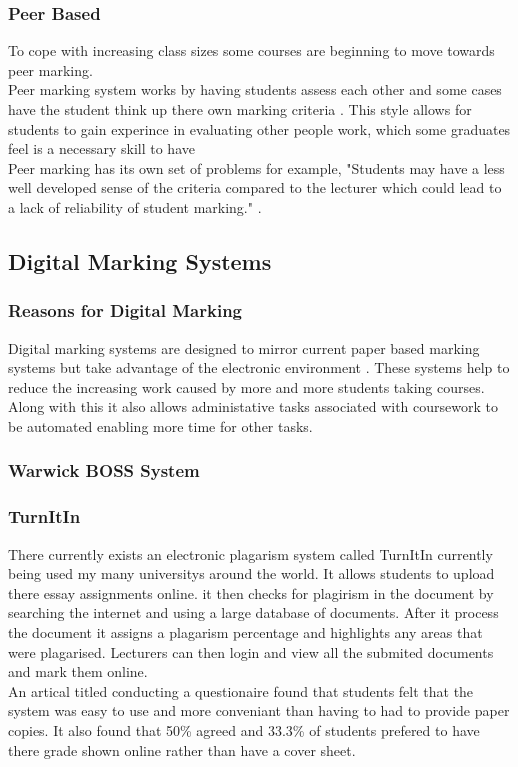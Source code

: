 \documentclass[12pt]{article}  %
\begin{document}
\subsubsection{Peer Based}
To cope with increasing class sizes some courses are beginning to move towards peer marking.\\
Peer marking system works by having students assess each other and some cases have the student think up there own marking criteria \cite{orsmond_use_2000}. This style allows for students to gain experince in evaluating other people work, which some graduates feel is a necessary skill to have \cite{langan_insights_????} \\
Peer marking has its own set of problems for example, "Students may have a less well developed sense of the criteria compared to the lecturer which could lead to a lack of reliability of student marking." \cite{orsmond_use_2000}. \\ 

\newpage
\subsection{Digital Marking Systems}

\subsubsection{Reasons for Digital Marking}
Digital marking systems are designed to mirror current paper based marking systems but take advantage of the electronic environment \cite{heinrich_online_2003}. These systems help to reduce the increasing work caused by more and more students taking courses. Along with this it also allows administative tasks associated with coursework to be automated enabling more time for other tasks.\cite{joy_effective_1998}  

\subsubsection{Warwick BOSS System}

\subsubsection{TurnItIn}
There currently exists an electronic plagarism system called TurnItIn \cite{_turnitin_????} currently being used my many universitys around the world. It allows students to upload there essay assignments online. it then checks for plagirism in the document by searching the internet and using a large database of documents. After it process the document it assigns a plagarism percentage and highlights any areas that were plagarised. Lecturers can then login and view all the submited documents and mark them online.\\
An artical titled  \cite{dahl_turnitin_2007} conducting a questionaire found that students felt that the system was easy to use and more conveniant than having to had to provide paper copies. It also found that 50\% agreed and 33.3\% of students prefered to have there grade shown online rather than have a cover sheet.
\end{document}
